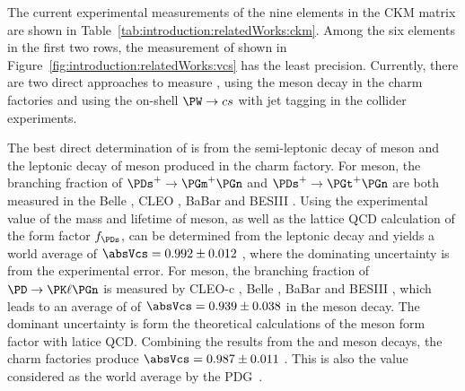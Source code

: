 \begin{table}[ht]
    \centering
    \setlength{\tabcolsep}{1.5em}
    \renewcommand{\arraystretch}{1.5}
    \caption{World average of the experimental measurements of the nine elements in the CKM matrix in the PDG \cite{pdg2020}.  }
    \label{tab:introduction:relatedWorks:ckm}
\end{table}


The current experimental measurements of the nine elements in the CKM matrix \cite{pdg2020} are shown in Table~\ref{tab:introduction:relatedWorks:ckm}. Among the six elements in the first two rows, the measurement of \absVcs shown in Figure~\ref{fig:introduction:relatedWorks:vcs} has the least precision. Currently, there are two direct approaches to measure \absVcs, using the \PD meson decay in the charm factories and using the on-shell $\PW\to c s$  with jet tagging in the collider experiments.

The best direct determination of \absVcs is from the semi-leptonic decay of \PD meson and the leptonic decay of \PDs meson produced in the charm factory. For \PDs meson, the branching fraction of $\PDs^+ \to \PGm^+ \PGn$ and $\PDs^+ \to \PGt^+ \PGn$ are both measured in the Belle \cite{Zupanc:2013byn}, CLEO \cite{Alexander:2009ux,Onyisi:2009th,Naik:2009tk}, BaBar \cite{delAmoSanchez:2010jg} and BESIII \cite{Ablikim:2016duz, Ablikim:2018jun}. Using the experimental value of the mass and lifetime of \PDs meson, as well as the lattice QCD calculation of the form factor $f_{\PDs}$, \absVcs can be determined from the \PDs leptonic decay and yields a world average of $\absVcs=0.992\pm 0.012$ \cite{Amhis:2019ckw}, where the dominating uncertainty is from the experimental error. For \PD meson, the branching fraction of $\PD\to \PK \ell\PGn$ is measured by CLEO-c \cite{Besson:2009uv}, Belle \cite{Widhalm:2006wz}, BaBar \cite{Aubert:2007wg} and BESIII \cite{Ablikim:2015ixa, Ablikim:2018evp}, which leads to an average of \absVcs of $\absVcs=0.939\pm 0.038$ \cite{Amhis:2019ckw} in the \PD meson decay. The dominant uncertainty is form the theoretical calculations of the \PD meson form factor with latice QCD. Combining the results from the \PD and \PDs meson decays, the charm factories produce $\absVcs=0.987\pm 0.011$ \cite{Amhis:2019ckw}. This is also the value considered as the world average by the PDG~\cite{pdg2020}.

